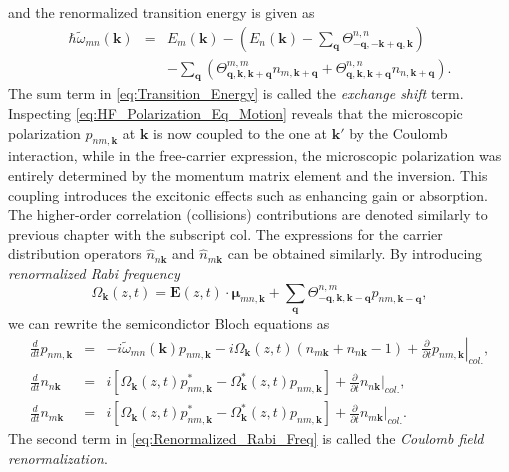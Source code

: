 and the renormalized transition energy is given as\begin{eqnarray}
\hbar\tilde{\omega}_{mn}(\mathbf{k}) & = & E_{m}(\mathbf{k})-\left(E_{n}(\mathbf{k})-\sum_{\mathbf{q}}\Theta_{-\mathbf{q},-\mathbf{k}+\mathbf{q},\mathbf{k}}^{n,n}\right)\nonumber \\
 &  & -\sum_{\mathbf{q}}\left(\Theta_{\mathbf{q},\mathbf{k},\mathbf{k}+\mathbf{q}}^{m,m}n_{m,\mathbf{k}+\mathbf{q}}+\Theta_{\mathbf{q},\mathbf{k},\mathbf{k}+\mathbf{q}}^{n,n}n_{n,\mathbf{k}+\mathbf{q}}\right).\label{eq:Transition_Energy}\end{eqnarray}
The sum term in \ref{eq:Transition_Energy} is called the \emph{exchange
shift} term. Inspecting \ref{eq:HF_Polarization_Eq_Motion} reveals
that the microscopic polarization $p_{nm,\mathbf{k}}$ at $\mathbf{k}$
is now coupled to the one at $\mathbf{k}'$ by the Coulomb interaction,
while in the free-carrier expression, the microscopic polarization
was entirely determined by the momentum matrix element and the inversion.
This coupling introduces the excitonic effects such as enhancing gain
or absorption. The higher-order correlation (collisions) contributions
are denoted similarly to previous chapter with the subscript col.
The expressions for the carrier distribution operators $\hat{n}_{n\mathbf{k}}$
and $\hat{n}_{m\mathbf{k}}$ can be obtained similarly. By introducing
\emph{renormalized Rabi frequency} \begin{equation}
\Omega_{\mathbf{k}}(z,t)=\mathbf{E}(z,t)\cdot\boldsymbol{\mu}_{mn,\mathbf{k}}+\sum_{\mathbf{q}}\Theta_{-\mathbf{q},\mathbf{k},\mathbf{k}-\mathbf{q}}^{n,m}p_{nm,\mathbf{k}-\mathbf{q}},\label{eq:Renormalized_Rabi_Freq}\end{equation}
we can rewrite the semicondictor Bloch equations as\begin{eqnarray}
\frac{d}{dt}p_{nm,\mathbf{k}} & = & -i\tilde{\omega}_{mn}(\mathbf{k})p_{nm,\mathbf{k}}-i\Omega_{\mathbf{k}}(z,t)\left(n_{m\mathbf{k}}+n_{n\mathbf{k}}-1\right)+\frac{\partial}{\partial t}\left.p_{nm,\mathbf{k}}\right|_{col.},\label{eq:HF_Semicondictor_Bloch_Eq_1}\\
\frac{d}{dt}n_{n\mathbf{k}} & = & i\left[\Omega_{\mathbf{k}}(z,t)p_{nm,\mathbf{k}}^{*}-\Omega_{\mathbf{k}}^{*}(z,t)p_{nm,\mathbf{k}}\right]+\frac{\partial}{\partial t}\left.n_{n\mathbf{k}}\right|_{col.},\label{eq::HF_Semicondictor_Bloch_Eq_2}\\
\frac{d}{dt}n_{m\mathbf{k}} & = & i\left[\Omega_{\mathbf{k}}(z,t)p_{nm,\mathbf{k}}^{*}-\Omega_{\mathbf{k}}^{*}(z,t)p_{nm,\mathbf{k}}\right]+\frac{\partial}{\partial t}\left.n_{m\mathbf{k}}\right|_{col.}.\label{eq::HF_Semicondictor_Bloch_Eq_3}\end{eqnarray}
The second term in \ref{eq:Renormalized_Rabi_Freq} is called the
\emph{Coulomb field renormalization}.

